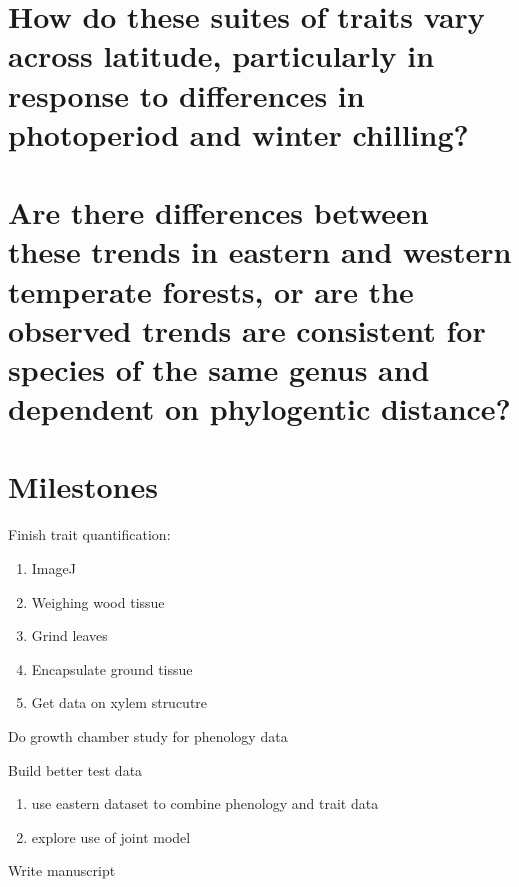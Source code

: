 \documentclass{article}\usepackage[]{graphicx}\usepackage[]{color}
\begin{document}
\section*{How do these suites of traits vary across latitude, particularly in response to differences in photoperiod and winter chilling?}
\par %

\section*{Are there differences between these trends in eastern and western temperate forests, or are the observed trends are consistent for species of the same genus and dependent on phylogentic distance?}
\par %

\section*{Milestones}

\par Finish trait quantification:
\begin{enumerate}
\item ImageJ
\item Weighing wood tissue
\item Grind leaves
\item Encapsulate ground tissue
\item Get data on xylem strucutre 
\end{enumerate}

\par Do growth chamber study for phenology data
\par Build better test data
\begin{enumerate}
\item use eastern dataset to combine phenology and trait data
\item explore use of joint model
\end{enumerate}

\par Write manuscript
\end{document}
